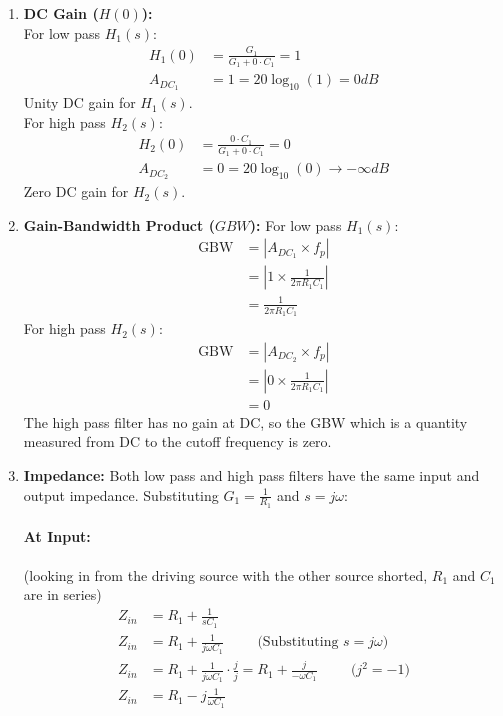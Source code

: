 \begin{enumerate}
    For high pass $H_2(s)$:
      \begin{align*}
        N_2(s) &= 0 \\
        sC_1 &= 0 \\
        s_z &= 0 \quad \text{[let \(s = s_z\)]}\\
        f_z &= \frac{|s_z|}{2\pi} = 0 Hz
      \end{align*}
    Zero at origin for \(H_2(s)\).
  \item \textbf{DC Gain (\(H(0)\)):} \\
    For low pass \(H_1(s)\):
      \begin{align*}
        H_1(0) &= \frac{G_1}{G_1 + 0 \cdot C_1} = 1 \\
        A_{DC_1} &= 1 = 20\log_{10}(1) = 0 dB
      \end{align*}
    Unity DC gain for \(H_1(s)\). \\
    For high pass \(H_2(s)\):
      \begin{align*}
        H_2(0) &= \frac{0 \cdot C_1}{G_1 + 0 \cdot C_1} = 0 \\
        A_{DC_2} &= 0 = 20\log_{10}(0) \to -\infty dB
      \end{align*}
    Zero DC gain for \(H_2(s)\).
  \item \textbf{Gain-Bandwidth Product (\(GBW\)):}
    For low pass \(H_1(s)\):
    \begin{align*}
      \text{GBW} &= |A_{DC_1} \times f_p| \\
                 &= |1 \times \frac{1}{2\pi R_1C_1}| \\
                 &= \frac{1}{2\pi R_1C_1}
    \end{align*}
    For high pass \(H_2(s)\):
    \begin{align*}
      \text{GBW} &= |A_{DC_2} \times f_p| \\
                 &= |0 \times \frac{1}{2\pi R_1C_1}| \\
                 &= 0
    \end{align*}
    The high pass filter has no gain at DC, so the GBW which
    is a quantity measured from DC to the cutoff frequency is
    zero.
  \item \textbf{Impedance:}
    Both low pass and high pass filters have the same input
    and output impedance.
    Substituting \(G_1 = \frac{1}{R_1}\) and \(s = j \omega\):
    \paragraph{At Input:} (looking in from the driving source with the other
    source shorted, \(R_1\) and \(C_1\) are in series)
      \begin{align*}
        Z_{in} &= R_1 + \frac{1}{sC_1} \\
        Z_{in} &= R_1 + \frac{1}{j \omega C_1} \hspace{1cm} \text{(Substituting \(s = j \omega\))} \\
        Z_{in} &= R_1 + \frac{1}{j \omega C_1} \cdot \frac{j}{j} = R_1 + \frac{j}{-\omega C_1} \hspace{1cm} \text{(\(j^2 = -1\))} \\
        Z_{in} &= R_1 - j \frac{1}{\omega C_1}
      \end{align*}

\end{enumerate}
